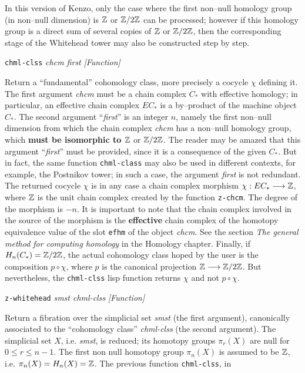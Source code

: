 In this version of Kenzo, only the case where the first non--null
homology group (in non--null dimension) is ${\mathbb{Z}}$ or ${\mathbb{Z}}/{2 {\mathbb{Z}}}$ can be processed; however if this
homology group is a direct sum of several copies of ${\mathbb{Z}}$ or ${\mathbb{Z}}/{2 {\mathbb{Z}}}$, then the corresponding
stage of the Whitehead tower may also be constructed step by step.
\vskip 0.35cm
{\parindent=0mm
{\leftskip=5mm
{\tt chml-clss} {\em chcm first}  \hfill {\em [Function]} \par}
{\leftskip=15mm
Return a ``fundamental'' cohomology class, more precisely a cocycle $\chi$ defining it.
The first argument {\em chcm} must be a chain complex $C_*$ with effective homology; in particular,
an effective chain complex $EC_*$ is a by--product of the machine object $C_*$. The second argument ``{\em first}''
is an integer $n$, namely the first non--null dimension from which the chain complex
{\em chcm} has a non--null homology group, which {\bf must be isomorphic to ${\mathbb{Z}}$} or ${\mathbb{Z}}/{2 {\mathbb{Z}}}$.
The reader may be amazed that this argument ``{\em first}'' must be provided, since it is  a consequence
of the given $C_*$. But in fact, the same function {\tt chml-class} may also be used in different contexts, for example,
the Postnikov tower; in such a case, the argument {\em first} is not redundant. The returned cocycle $\chi$
is in any case a chain complex morphism $\chi: EC_* \longrightarrow {\mathbb{Z}}$, where ${\mathbb{Z}}$ is the unit chain complex
created by the function {\tt z-chcm}. The degree of the morphism is $- n$.
It is important to note that  the chain complex involved in the source of the morphism
is the {\bf effective} chain complex of the homotopy equivalence value of the slot {\tt efhm} of
the object {\em chcm}. See the section {\em The general method for computing homology} in the Homology chapter.
Finally, if $H_n(C_*)={\mathbb{Z}}/{2 {\mathbb{Z}}}$, the actual cohomology class hoped by the user is the composition
$p \circ \chi$, where $p$ is the canonical projection ${\mathbb{Z}} \longrightarrow {\mathbb{Z}}/{2 {\mathbb{Z}}}$. But nevertheless,
the {\tt chml-clss} lisp function returns $\chi$ and not $p \circ \chi$.
\par}
{\leftskip=5mm
{\tt z-whitehead} {\em smst chml-clss}  \hfill {\em [Function]} \par}
{\leftskip=15mm
Return a fibration  over the simplicial set {\em smst} (the first argument), canonically associated
to the ``cohomology class'' {\em chml-clss} (the second argument). The simplicial set $X$, i.e. {\em smst}, is
reduced; its homotopy groups $\pi_r(X)$ are null for $0 \leq r \leq n-1$. The first non null homotopy group
$\pi_n(X)$ is assumed to be ${\mathbb{Z}}$, i.e. $\pi_n(X)= H_n(X)= {\mathbb{Z}}$. The previous function {\tt chml-clss}, in
}}
